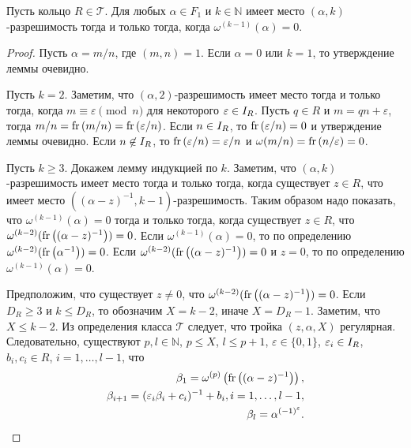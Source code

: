\documentclass[_00_dissertation.tex]{subfiles}
\begin{document}
\begin{lemma}\label{lemma:omega_and_euclidean_algorithm}
    Пусть кольцо $R \in \mathcal{T}$.
    Для любых $\alpha \in F_1$ и $k \in \mathbb{N}$ имеет место $(\alpha, k)$-разрешимость тогда и только тогда, когда $\omega^{(k-1)}(\alpha) = 0$.
\end{lemma}
\begin{proof}
    Пусть $\alpha = m/n$, где $(m, n) = 1$.
    Если $\alpha = 0$ или $k = 1$, то утверждение леммы очевидно.

    Пусть $k = 2$.
    Заметим, что $(\alpha, 2)$-разрешимость имеет место тогда и только тогда, когда $m \equiv \varepsilon \pmod{n}$ для некоторого $\varepsilon \in I_{R}$.
    Пусть $q \in R$ и $m = q n + \varepsilon$, тогда $m/n = \textrm{fr}\left(m/n\right) = \textrm{fr}\left(\varepsilon/n\right)$.
    Если $n \in I_{R}$, то $\textrm{fr}\left(\varepsilon/n\right) = 0$ и утверждение леммы очевидно.
    Если $n \not\in I_{R}$, то $\textrm{fr}\left(\varepsilon/n\right) = \varepsilon/n$ и $\omega(m/n) = \textrm{fr}\left(n/\varepsilon\right) = 0$.

    Пусть $k \ge 3$.
    Докажем лемму индукцией по $k$.
    Заметим, что $(\alpha, k)$-разрешимость имеет место тогда и только тогда, когда существует $z \in R$, что имеет место $((\alpha - z)^{-1}, k-1)$-разрешимость.
    Таким образом надо показать, что $\omega^{(k-1)}(\alpha) = 0$ тогда и только тогда, когда существует $z \in R$, что $\omega^{(k-2)}(\textrm{fr}\left((\alpha - z)^{-1}\right)) = 0$.
    Если $\omega^{(k-1)}(\alpha) = 0$, то по определению $\omega^{(k-2)}(\textrm{fr}\left(\alpha^{-1}\right)) = 0$.
    Если $\omega^{(k-2)}(\textrm{fr}\left((\alpha - z)^{-1}\right)) = 0$ и $z = 0$, то по определению $\omega^{(k-1)}(\alpha) = 0$.

    Предположим, что существует $z \neq 0$, что $\omega^{(k-2)}(\textrm{fr}\left((\alpha - z)^{-1}\right)) = 0$.
    Если $D_R \ge 3$ и $k \le D_R$, то обозначим $X = k-2$, иначе $X = D_R - 1$.
    Заметим, что $X \le k-2$.
    Из определения класса $\mathcal{T}$ следует, что тройка $(z, \alpha, X)$ регулярная.
    Следовательно, существуют $p, l \in \mathbb{N}$, $p \le X$, $l \le p+1$, $\varepsilon \in \{0, 1\}$, $\varepsilon_i \in I_{R}$, $b_i, c_i \in R$, $i = 1, \dots, l-1$, что
    \begin{equation*}
        \begin{split}
            \beta_1 = \omega^{(p)}\left(\textrm{fr}\left((\alpha - z)^{-1}\right)\right),\\
            \beta_{i+1} = (\varepsilon_i \beta_i + c_i)^{-1} + b_i, i = 1, \dots, l-1,\\
            \beta_{l} = \alpha^{(-1)^{\varepsilon}}.
        \end{split}
    \end{equation*}


\end{proof}
\end{document}

